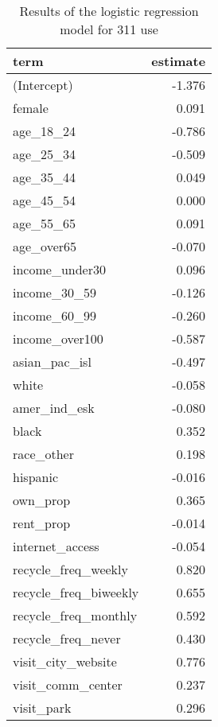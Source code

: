 \begin{table}[h!]

\caption{\label{tab:}Results of the logistic regression model for 311 use}
\centering
\begin{tabular}[t]{lr}
\toprule
term & estimate\\
\midrule
(Intercept) & -1.376\\
female & 0.091\\
age\_18\_24 & -0.786\\
age\_25\_34 & -0.509\\
age\_35\_44 & 0.049\\
\addlinespace
age\_45\_54 & 0.000\\
age\_55\_65 & 0.091\\
age\_over65 & -0.070\\
income\_under30 & 0.096\\
income\_30\_59 & -0.126\\
\addlinespace
income\_60\_99 & -0.260\\
income\_over100 & -0.587\\
asian\_pac\_isl & -0.497\\
white & -0.058\\
amer\_ind\_esk & -0.080\\
\addlinespace
black & 0.352\\
race\_other & 0.198\\
hispanic & -0.016\\
own\_prop & 0.365\\
rent\_prop & -0.014\\
\addlinespace
internet\_access & -0.054\\
recycle\_freq\_weekly & 0.820\\
recycle\_freq\_biweekly & 0.655\\
recycle\_freq\_monthly & 0.592\\
recycle\_freq\_never & 0.430\\
\addlinespace
visit\_city\_website & 0.776\\
visit\_comm\_center & 0.237\\
visit\_park & 0.296\\
\bottomrule
\end{tabular}
\end{table}